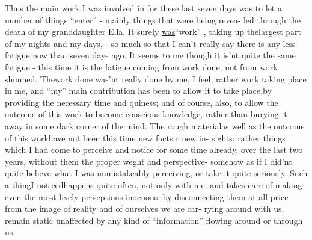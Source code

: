 Thus the main work I was involved in for these last seven days was
to let a number of things ``enter''  -  mainly things that were being revea-%
led through the death of my granddaughter Ella.  It surely \uline{was}\hand{|}``work''  ,
taking up the\hand{|}largest part of my nights and my days,  -  so much so that
I can't really say there is any less fatigue now than seven days ago. It
seems to me though it is'nt quite the same fatigue  -  this time it is
the fatigue coming from work done,  not from work shunned.  Thework done
was'nt really done by me,  I feel,  rather work taking place in me,  and
``my'' main contribution has been to allow it to take place,by providing
the necessary time and quiness;  and of course,  also,  to allow the
outcome of this work to become conscious knowledge,  rather than burying
it away in some dark corner of the mind.  The  rough material\hand{,}as well
as the outcome of this work\hand{,}have not been this time new facts r new in-%
sights;  rather\hand{,} things which I had come to perceive and notice for some
time already,  over the last two years,  without    them the
proper weght and perspective\over{;}{\unsure{,}}- somehow as if I did'nt quite believe what
I was unmistakeably perceiving,  or   take it quite seriously.  Such a
thing\hand{,}I noticed\hand{,}happens quite often,  not only with me,  and takes care
of making even the most lively perseptions inocuous,  by disconnecting
them at all price from the image of reality and of ourselves we are car-%
rying around with us,  \hand{\unsure{**}}   remain static\hand{,}  unaffected
by any kind of ``information'' flowing around or through us.

